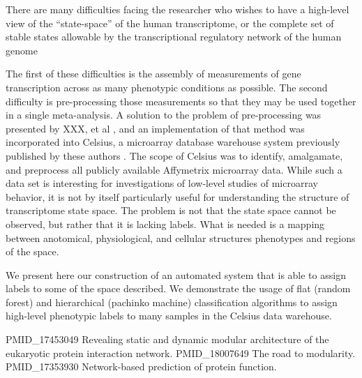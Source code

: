 There are many difficulties facing the researcher who wishes to have a
high-level view of the ``state-space'' of the human transcriptome, or the
complete set of stable states allowable by the transcriptional regulatory
network of the human genome %

The first of these difficulties is the assembly of measurements of gene
transcription across as many phenotypic conditions as possible.  The second
difficulty is pre-processing those measurements so that they may be used
together in a single meta-analysis.  A solution to the problem of
pre-processing was presented by XXX, et al \cite{genelogic}, and an
implementation of that method was incorporated into Celsius, a microarray
database warehouse system previously published by these authors \cite{celsius}.
The scope of Celsius was to identify, amalgamate, and preprocess all publicly
available Affymetrix microarray data.  While such a data set is interesting for
investigations of low-level studies of microarray behavior, it is not by itself
particularly useful for understanding the structure of transcriptome state
space.  The problem is not that the state space cannot be observed, but rather
that it is lacking labels.  What is needed is a mapping between anotomical,
physiological, and cellular structures phenotypes and regions of the space.

We present here our construction of an automated system that is able to assign
labels to some of the space described.  We demonstrate the usage of flat
(random forest) and hierarchical (pachinko machine) classification algorithms
to assign high-level phenotypic labels to many samples in the Celsius data
warehouse.


PMID_17453049	Revealing static and dynamic modular architecture of the eukaryotic protein interaction network.
PMID_18007649	The road to modularity.
PMID_17353930	Network-based prediction of protein function.
